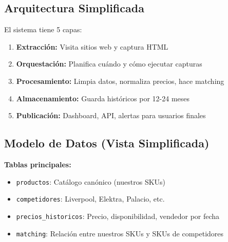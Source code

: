 \documentclass[12pt,a4paper]{article}
\begin{document}
\subsection{Arquitectura Simplificada}

El sistema tiene 5 capas:

\begin{enumerate}[leftmargin=*]
    \item \textbf{Extracción:} Visita sitios web y captura HTML
    \item \textbf{Orquestación:} Planifica cuándo y cómo ejecutar capturas
    \item \textbf{Procesamiento:} Limpia datos, normaliza precios, hace matching
    \item \textbf{Almacenamiento:} Guarda históricos por 12-24 meses
    \item \textbf{Publicación:} Dashboard, API, alertas para usuarios finales
\end{enumerate}

\subsection{Modelo de Datos (Vista Simplificada)}

\textbf{Tablas principales:}
\begin{itemize}[leftmargin=*]
    \item \texttt{productos}: Catálogo canónico (nuestros SKUs)
    \item \texttt{competidores}: Liverpool, Elektra, Palacio, etc.
    \item \texttt{precios\_historicos}: Precio, disponibilidad, vendedor por fecha
    \item \texttt{matching}: Relación entre nuestros SKUs y SKUs de competidores
\end{itemize}
\end{document}
